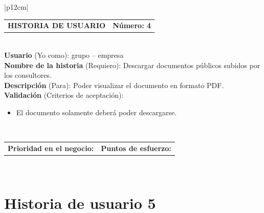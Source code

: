 \documentclass[11pt,letterpaper]{report}
\begin{document}
	\begin{center}	
		\begin{tabular}{|p{12cm}|}
			\hline
			\begin{tabular}{c|c}
				\textbf{HISTORIA DE USUARIO} & \textbf{Número: 4} \\
			\end{tabular} \\ \hline
			\textbf{Usuario} (Yo como): grupo – empresa \\ \hline
			\textbf{Nombre de la historia} (Requiero): Descargar documentos públicos subidos por los consultores. \\ \hline
			\textbf{Descripción} (Para): Poder visualizar el documento en formato PDF. \\ \hline
			\textbf{Validación} (Criterios de aceptación): \\
			\begin{minipage}{12cm}
				\begin{itemize}
					\item El documento solamente deberá poder descargarse.
				\end{itemize}
			\end{minipage} \\ \hline
			\begin{tabular}{c|c}
				\textbf{Prioridad en el negocio: } & \textbf{Puntos de esfuerzo: } \\
			\end{tabular} \\ \hline
		\end{tabular}
	\end{center}
	
	\section{Historia de usuario 5}	
	
\end{document}
